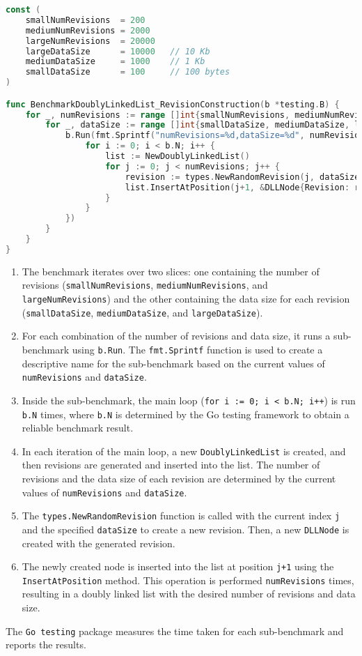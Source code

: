 \begin{lstlisting}[language=go]
const (
	smallNumRevisions  = 200
	mediumNumRevisions = 2000
	largeNumRevisions  = 20000
	largeDataSize      = 10000   // 10 Kb
	mediumDataSize     = 1000    // 1 Kb
	smallDataSize      = 100     // 100 bytes
)

func BenchmarkDoublyLinkedList_RevisionConstruction(b *testing.B) {
	for _, numRevisions := range []int{smallNumRevisions, mediumNumRevisions, largeNumRevisions} {
		for _, dataSize := range []int{smallDataSize, mediumDataSize, largeDataSize} {
			b.Run(fmt.Sprintf("numRevisions=%d,dataSize=%d", numRevisions, dataSize), func(b *testing.B) {
				for i := 0; i < b.N; i++ {
					list := NewDoublyLinkedList()
					for j := 0; j < numRevisions; j++ {
						revision := types.NewRandomRevision(j, dataSize)
						list.InsertAtPosition(j+1, &DLLNode{Revision: revision})
					}
				}
			})
		}
	}
}
\end{lstlisting}

\begin{enumerate}
    \item The benchmark iterates over two slices: one containing the number of revisions (\lstinline{smallNumRevisions}, \lstinline{mediumNumRevisions}, and \lstinline{largeNumRevisions}) and the other containing the data size for each revision (\lstinline{smallDataSize}, \lstinline{mediumDataSize}, and \lstinline{largeDataSize}).
    \item For each combination of the number of revisions and data size, it runs a sub-benchmark using \lstinline{b.Run}. The \lstinline{fmt.Sprintf} function is used to create a descriptive name for the sub-benchmark based on the current values of \lstinline{numRevisions} and \lstinline{dataSize}.
    \item Inside the sub-benchmark, the main loop (\lstinline{for i := 0; i < b.N; i++}) is run \lstinline{b.N} times, where \lstinline{b.N} is determined by the Go testing framework to obtain a reliable benchmark result.
    \item In each iteration of the main loop, a new \lstinline{DoublyLinkedList} is created, and then revisions are generated and inserted into the list. The number of revisions and the data size of each revision are determined by the current values of \lstinline{numRevisions} and \lstinline{dataSize}.
    \item The \lstinline{types.NewRandomRevision} function is called with the current index \lstinline{j} and the specified \lstinline{dataSize} to create a new revision. Then, a new \lstinline{DLLNode} is created with the generated revision.
    \item The newly created node is inserted into the list at position \lstinline{j+1} using the \lstinline{InsertAtPosition} method. This operation is performed \lstinline{numRevisions} times, resulting in a doubly linked list with the desired number of revisions and data size.
\end{enumerate}
The \lstinline{Go testing} package measures the time taken for each sub-benchmark and reports the results.

